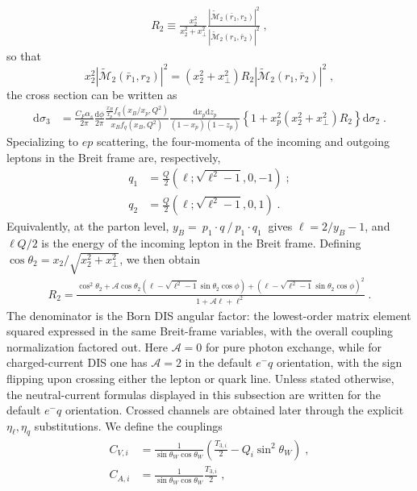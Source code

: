 \documentclass[a4paper,11pt]{article}
\newcommand{\ldot}[2]  {\:{#1}\!\cdot\!{#2}\:}
\begin{document}
\begin{align}\label{eq:R2}
R_2 \equiv \frac{x_2^2}{x^2_2+x^2_\perp} \frac{|\widetilde{\mathcal{M}}_2(\bar{r}_1,r_2)|^2}{|\widetilde{\mathcal{M}}_2(r_1,\bar{r}_2)|^2}\;,
\end{align}
so that
\begin{equation}
  x_2^2 |\widetilde{\mathcal{M}}_2(\bar{r}_1,r_2)|^2
  = (x_2^2+x_\perp^2) R_2 |\widetilde{\mathcal{M}}_2(r_1,\bar{r}_2)|^2\;,
\end{equation}
the cross section can be written as
\begin{align}
  \mathrm{d}\sigma_3 &= \frac{C_F\alpha_s}{2\pi}\frac{\mathrm{d}\phi}{2\pi}
    \frac{\frac{x_B}{x_p} f_q(x_B/x_p,Q^2)}
         { x_B    f_q( x_B    ,Q^2)}
    \frac{\mathrm{d} x_p \mathrm{d}z_p}{(1-x_p)(1-z_p)} \left\{ 1 +
         x_p^2 (x_2^2 + x_\perp^2) R_2 \right\} \mathrm{d} \sigma_2\;.
\label{eq:QCDC3}
\end{align}
Specializing to $ep$ scattering, the four-momenta of the incoming and outgoing leptons in the Breit frame are, respectively,
\begin{align}
q_1 &= \frac{Q}2(\ell;\sqrt{\ell^2-1},0,-1)\;;\\
q_2 &= \frac{Q}2(\ell;\sqrt{\ell^2-1},0,1)\;.
\end{align}
Equivalently, at the parton level, $y_B=\ldot{p_1}{q}/\ldot{p_1}{q_1}$ gives $\ell = 2/y_B -1$, and $\ell Q/2$ is the energy of the incoming lepton in the Breit frame. Defining $\cos\theta_2 = x_2 / \sqrt{x_2^2 + x_\perp^2}$, we then obtain
\begin{align}\label{eq:R2expression}
R_2 = \frac{\cos^2\theta_2+\mathcal{A}\cos\theta_2\left(\ell-\sqrt{\ell^2-1}\sin\theta_2\cos\phi\right)+\left(\ell-\sqrt{\ell^2-1}\sin\theta_2\cos\phi\right)^2}{1+\mathcal{A}\ell+\ell^2}\;.
\end{align}
The denominator is the Born DIS angular factor: the lowest-order
matrix element squared expressed in the same Breit-frame variables,
with the overall coupling normalization factored out. Here
$\mathcal{A}=0$ for pure photon exchange, while for charged-current
DIS one has $\mathcal{A}=2$ in the default $e^-q$ orientation, with
the sign flipping upon crossing either the lepton or quark
line. Unless stated otherwise, the neutral-current formulas displayed
in this subsection are written for the default $e^-q$ orientation.
Crossed channels are obtained later through the explicit
$\eta_\ell,\eta_q$ substitutions. We define the couplings
\begin{align}
C_{V,i} &= \frac{1}{\sin\theta_W \cos\theta_W} \left(\frac{T_{3,i}}{2} - Q_i \sin^2 \theta_W\right)\;,\\
C_{A,i} &= \frac{1}{\sin\theta_W \cos\theta_W} \frac{T_{3,i}}{2}\;,
\end{align}
\end{document}
